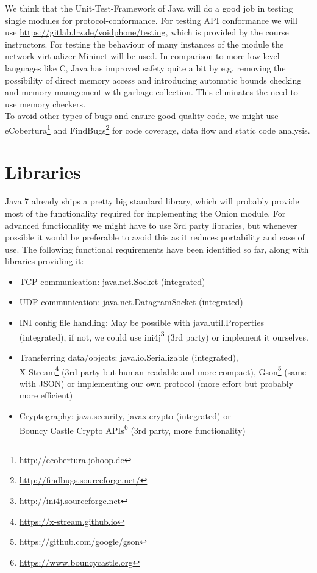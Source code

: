 \documentclass{article}
\begin{document}
We think that the Unit-Test-Framework of Java will do a good job in testing
single modules for protocol-conformance. For testing API
conformance we will use \url{https://gitlab.lrz.de/voidphone/testing}, which is
provided by the course instructors. For testing the behaviour of many instances
of the module the network virtualizer Mininet will be used.
In comparison to more low-level languages like C, Java has improved safety quite a bit by e.g. removing the possibility of direct memory access and introducing automatic bounds checking and memory management with garbage collection. This eliminates the need to use memory checkers. \\
To avoid other types of bugs and ensure good quality code, we might use eCobertura\footnote{\url{http://ecobertura.johoop.de}} and FindBugs\footnote{\url{http://findbugs.sourceforge.net/}} for code coverage, data flow and static code analysis.

\section{Libraries}
Java 7 already ships a pretty big standard library, which will probably provide most of the functionality required for implementing the Onion module. For advanced functionality we might have to use 3rd party libraries, but whenever possible it would be preferable to avoid this as it reduces portability and ease of use. 
The following functional requirements have been identified so far, along with libraries providing it:
\begin{itemize}
\item TCP communication: java.net.Socket (integrated)
\item UDP communication: java.net.DatagramSocket (integrated)
\item INI config file handling: May be possible with java.util.Properties (integrated), if not, we could use ini4j\footnote{\url{http://ini4j.sourceforge.net}} (3rd party) or implement it ourselves.
\item Transferring data/objects: java.io.Serializable (integrated), \\ X-Stream\footnote{\url{https://x-stream.github.io}} (3rd party but human-readable and more compact), Gson\footnote{\url{https://github.com/google/gson}} (same with JSON) or implementing our own protocol (more effort but probably more efficient)
\item Cryptography: java.security, javax.crypto (integrated) or \\ Bouncy Castle Crypto APIs\footnote{\url{https://www.bouncycastle.org}} (3rd party, more functionality)
\end{itemize}
\end{document}
